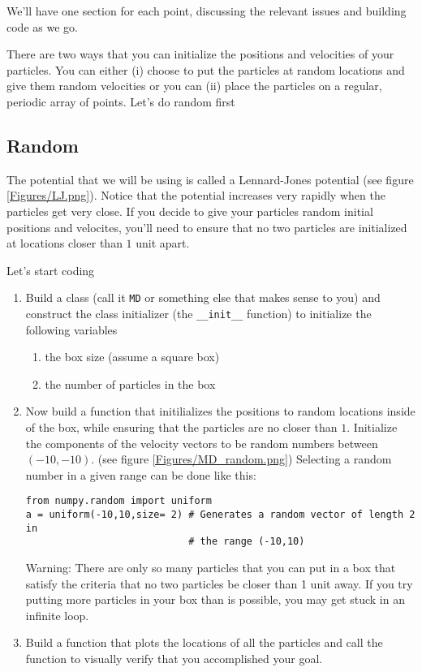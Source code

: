 We'll have one section for each point, discussing the relevant issues
and building code as we go.

There are two ways that you can initialize the positions and
velocities of your particles.  You can either (i) choose to put the
particles at random locations and give them random velocities or you
can (ii) place the particles on a regular, periodic array of points.
Let's do random first
\subsection*{Random}
 The potential
that we will be using is called a Lennard-Jones potential (see figure
\ref{Figures/LJ.png}).  Notice that the potential increases very
rapidly when the particles get very close.  If you decide to give your
particles random initial positions and velocites, you'll need to
ensure that no two particles are initialized at locations closer than
$1$ unit apart.

\begin{enumerate}
\probtwo  Let's start coding
\begin{enumerate}
\item Build a class (call it \verb!MD! or something else that
makes sense to  you) and construct the class initializer (the
\verb!__init__! function) to initialize the following
variables
\begin{enumerate}
\item the box size (assume a square box)
\item the number of particles in the box
\end{enumerate}
\item Now build a function that initilializes the positions to random
  locations inside of the box, while ensuring that the particles are
  no closer than $1$. Initialize the components of the velocity
  vectors to be random numbers between $(-10,-10)$. (see figure
  \ref{Figures/MD_random.png}) Selecting a random number in a given
  range can be done like this:
\begin{Verbatim}
from numpy.random import uniform
a = uniform(-10,10,size= 2) # Generates a random vector of length 2 in
                            # the range (-10,10) 
\end{Verbatim}
Warning: There are only so many particles that you can put in a box
that satisfy the criteria that no two particles be closer than 1 unit
away.  If you try putting more particles in your box than is possible,
you may get stuck in an infinite loop.
\item Build a function that plots the locations of all the particles
  and call the function to visually verify that you accomplished your goal.
\end{enumerate}
\end{enumerate}

